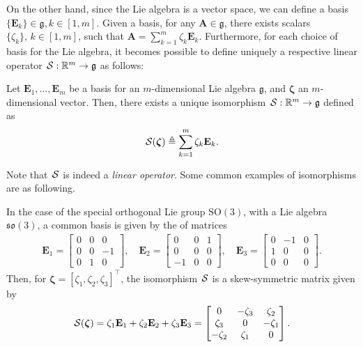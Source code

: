  On the other hand, since the Lie algebra is a vector space, we can define a basis $\{\mathbf{E}_k\}\in\mathfrak{g}, k\in[1,m]$. Given a basis, for any $\mathbf{A} \in\mathfrak{g}$, there exists scalars $\{\zeta_k\},\, k\in[1,m]$, such that $\mathbf{A} = \sum_{k=1}^{m} \zeta_k\mathbf{E}_k$. Furthermore, for each choice of basis for the Lie algebra, it becomes possible to define uniquely a respective linear operator $\SL:\mathbb{R}^{m}\to\mathfrak{g}$ as follows:
\begin{definition}[S map]\label{def:SL-left-isomorphism-act-on-xi}
    Let $\mathbf{E}_1,\dots,\mathbf{E}_m$ be a basis for an $m$-dimensional Lie algebra $\mathfrak{g}$, and $\boldsymbol{\zeta}$ an $m$-dimensional vector. Then, there exists a unique isomorphism $\SL:\mathbb{R}^{m}\to\mathfrak{g}$ defined as
    \begin{equation}
        \SL[\boldsymbol{\zeta}] \triangleq \sum_{k=1}^m\zeta_k\mathbf{E}_k.    
    \end{equation}
    
\end{definition}
Note that $\SL$ is indeed a \emph{linear operator}. Some common examples of isomorphisms are as following.
\begin{example}
    In the case of the special orthogonal Lie group $\text{SO}(3)$, with a Lie algebra $\mathfrak{so}(3)$, a common basis is given by the of matrices
    \begin{align*}
        \mathbf{E}_1 = \begin{bmatrix} 0 & 0 & 0 \\ 0 & 0 & -1 \\ 0 & 1 & 0 \end{bmatrix}, \quad \mathbf{E}_2 = \begin{bmatrix} 0 & 0 & 1 \\ 0 & 0 & 0 \\ -1 & 0 & 0 \end{bmatrix}, \quad \mathbf{E}_3 = \begin{bmatrix} 0 & -1 & 0 \\ 1 & 0 & 0 \\ 0 & 0 & 0 \end{bmatrix}.
    \end{align*}
    Then, for $\boldsymbol{\zeta} = [\zeta_1, \zeta_2, \zeta_3]^\top$, the isomorphism $\SL$ is a skew-symmetric matrix given by
    \begin{align*}
        \SL[\boldsymbol{\zeta}] = \zeta_1 \mathbf{E}_1 + \zeta_2 \mathbf{E}_2 + \zeta_3 \mathbf{E}_3
        = \begin{bmatrix} 0 & -\zeta_3 & \zeta_2 \\ \zeta_3 & 0 & -\zeta_1 \\ -\zeta_2 & \zeta_1 & 0 \end{bmatrix}.
    \end{align*}
\end{example}
